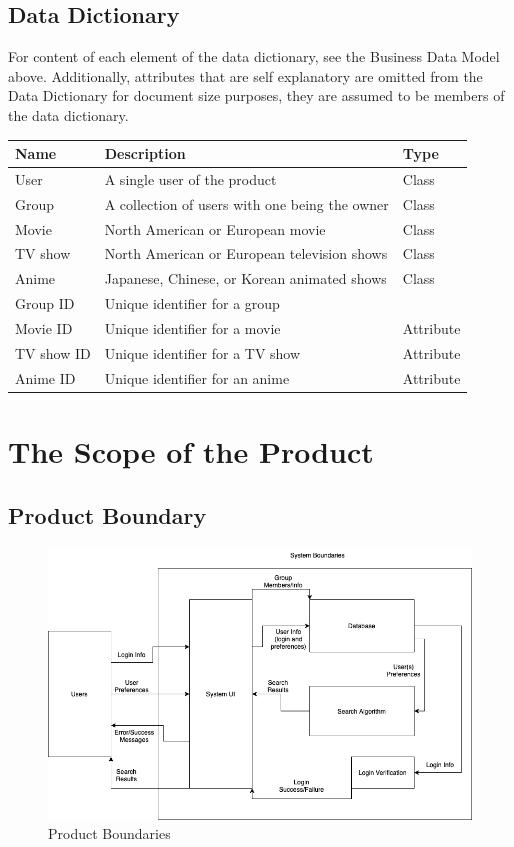 \documentclass[12pt]{article}
\begin{document}
\subsection{Data Dictionary}
For content of each element of the data dictionary, see the Business Data Model above.
Additionally, attributes that are self explanatory are omitted from the Data Dictionary for document size purposes, they are assumed to be members of the data dictionary.

\begin{tabularx}{\textwidth}{|p{3cm}|p{10cm}|X|}
 	\hline {\bf Name} & {\bf Description} & {\bf Type}\\
	\hline
	User & A single user of the product & Class \\
	Group & A collection of users with one being the owner & Class \\
	Movie & North American or European movie & Class\\
	TV show & North American or European television shows & Class\\
	Anime & Japanese, Chinese, or Korean animated shows & Class\\
	Group ID & Unique identifier for a group & \\
	Movie ID & Unique identifier for a movie & Attribute \\
	TV show ID & Unique identifier for a TV show & Attribute \\
	Anime ID & Unique identifier for an anime & Attribute \\
	\hline
\end{tabularx}

\pagebreak
\section{The Scope of the Product}
\subsection{Product Boundary}
\begin{figure}[h]
\includegraphics[scale=0.6]{SystemBoundariesDiagram.png}
\caption{Product Boundaries}
\end{figure}
\end{document}
